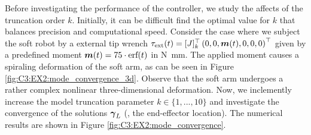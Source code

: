 \begin{example}
 Before investigating the performance of the controller, we study the affects of the truncation order $k$. Initially, it can be difficult find the optimal value for $k$ that balances precision and computational speed. Consider the case where we subject the soft robot by a external tip wrench $\tau_\textrm{ext}(t) = [J]_k^\top \left(0,0,{\boldsymbol{m}}(t),0,0,0 \right)^\top$ given by a predefined moment ${\boldsymbol{m}}(t) = 75 \cdot \textrm{erf}(t)$ in \si{\newton \milli \meter}. The applied moment causes a spiraling deformation of the soft arm, as can be seen in Figure \ref{fig:C3:EX2:mode_convergence_3d}. Observe that the soft arm undergoes a rather complex nonlinear three-dimensional deformation. Now, we inclemently increase the model truncation parameter $k \in \{1,...,10\}$ and investigate the convergence of the solutions ${\boldsymbol{\gamma}}_L$ (\ie, the end-effector location). The numerical results are shown in Figure \ref{fig:C3:EX2:mode_convergence}. 
 

\end{example}
